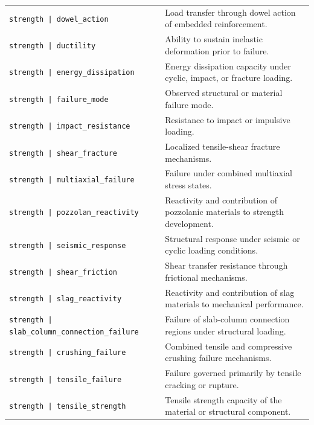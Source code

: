 \documentclass[11pt]{book}
\begin{document}
{\begin{longtable}{p{}p{}}
\texttt{strength | dowel\_action} &
Load transfer through dowel action of embedded reinforcement. \\

\texttt{strength | ductility} &
Ability to sustain inelastic deformation prior to failure. \\

\texttt{strength | energy\_dissipation} &
Energy dissipation capacity under cyclic, impact, or fracture loading. \\

\texttt{strength | failure\_mode} &
Observed structural or material failure mode. \\

\texttt{strength | impact\_resistance} &
Resistance to impact or impulsive loading. \\

\texttt{strength | shear\_fracture} &
Localized tensile-shear fracture mechanisms. \\

\texttt{strength | multiaxial\_failure} &
Failure under combined multiaxial stress states. \\

\texttt{strength | pozzolan\_reactivity} &
Reactivity and contribution of pozzolanic materials to strength development. \\

\texttt{strength | seismic\_response} &
Structural response under seismic or cyclic loading conditions. \\

\texttt{strength | shear\_friction} &
Shear transfer resistance through frictional mechanisms. \\

\texttt{strength | slag\_reactivity} &
Reactivity and contribution of slag materials to mechanical performance. \\

\texttt{strength | slab\_column\_connection\_failure} &
Failure of slab-column connection regions under structural loading. \\

\texttt{strength | crushing\_failure} &
Combined tensile and compressive crushing failure mechanisms. \\

\texttt{strength | tensile\_failure} &
Failure governed primarily by tensile cracking or rupture. \\

\texttt{strength | tensile\_strength} &
Tensile strength capacity of the material or structural component. \\


\end{longtable}}
\end{document}
